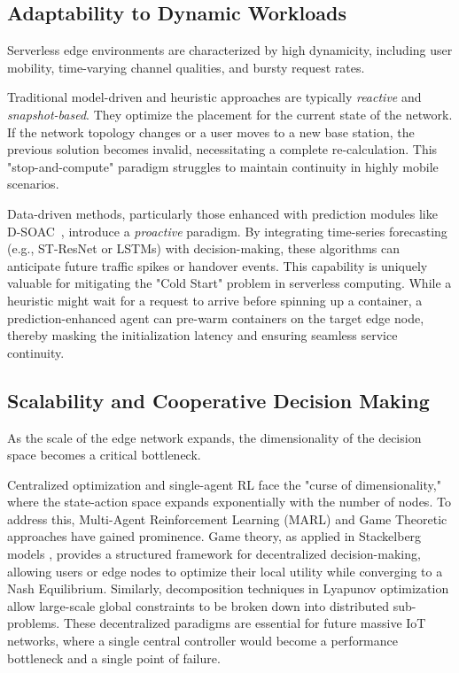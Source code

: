 \documentclass[lettersize,journal]{IEEEtran}
\begin{document}
\subsection{Adaptability to Dynamic Workloads}
Serverless edge environments are characterized by high dynamicity, including user mobility, time-varying channel qualities, and bursty request rates.

Traditional model-driven and heuristic approaches are typically \textit{reactive} and \textit{snapshot-based}. They optimize the placement for the current state of the network. If the network topology changes or a user moves to a new base station, the previous solution becomes invalid, necessitating a complete re-calculation. This "stop-and-compute" paradigm struggles to maintain continuity in highly mobile scenarios.

Data-driven methods, particularly those enhanced with prediction modules like D-SOAC~\cite{xu2021DSOAC}, introduce a \textit{proactive} paradigm. By integrating time-series forecasting (e.g., ST-ResNet or LSTMs) with decision-making, these algorithms can anticipate future traffic spikes or handover events. This capability is uniquely valuable for mitigating the "Cold Start" problem in serverless computing. While a heuristic might wait for a request to arrive before spinning up a container, a prediction-enhanced agent can pre-warm containers on the target edge node, thereby masking the initialization latency and ensuring seamless service continuity.

\subsection{Scalability and Cooperative Decision Making}
As the scale of the edge network expands, the dimensionality of the decision space becomes a critical bottleneck.

Centralized optimization and single-agent RL face the "curse of dimensionality," where the state-action space expands exponentially with the number of nodes. To address this, Multi-Agent Reinforcement Learning (MARL) and Game Theoretic approaches have gained prominence. Game theory, as applied in Stackelberg models \cite{sun2023Stackelberg}, provides a structured framework for decentralized decision-making, allowing users or edge nodes to optimize their local utility while converging to a Nash Equilibrium. Similarly, decomposition techniques in Lyapunov optimization allow large-scale global constraints to be broken down into distributed sub-problems. These decentralized paradigms are essential for future massive IoT networks, where a single central controller would become a performance bottleneck and a single point of failure.
\end{document}
